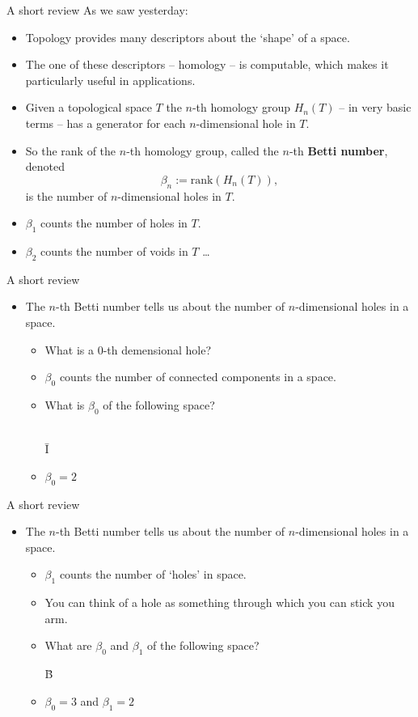 \begin{frame}{A short review}
As we saw yesterday:
\begin{itemize}
\item<2-> Topology provides many descriptors about the `shape' of a space.
\item<3-> The one of these descriptors -- homology -- is computable, which makes it particularly useful in applications.
\item<4-> Given a topological space $T$ the $n$-th homology group $H_n(T)$ -- in very basic terms -- has a generator for each $n$-dimensional hole in $T$. 
\item<5-> So the rank of the $n$-th homology group, called the $n$-th \textbf{Betti number}, denoted
	\[
	\beta_n := \textrm{rank}(H_n(T)),
	\]
is the number of $n$-dimensional holes in $T$.
\item<6-> $\beta_1$ counts the number of holes in $T$.
\item<7-> $\beta_2$ counts the number of voids in $T$ \ldots
\end{itemize}
\end{frame}
\begin{frame}{A short review}
\begin{itemize}
\item The $n$-th Betti number tells us about the number of $n$-dimensional holes in a space.
	\begin{itemize}
	\item<1-> What is a $0$-th demensional hole?
	\item<2-> $\beta_0$ counts the number of connected components in a space.
	\item<3-> What is $\beta_0$ of the following space?\\
	\
	\begin{center}
	{\fontsize{50pt}{1pt}\selectfont \={I}}
	\end{center}
	\item<4-> $\beta_0 = 2$
	\end{itemize}
\end{itemize}
\end{frame}
\begin{frame}{A short review}
\begin{itemize}
\item The $n$-th Betti number tells us about the number of $n$-dimensional holes in a space.
	\begin{itemize}
	\item<1-> $\beta_1$ counts the number of `holes' in space.
	\item<2-> You can think of a hole as something through which you can stick you arm.
	\item<3-> What are $\beta_0$ and $\beta_1$ of the following space?
	\begin{center}
	{\fontsize{50pt}{12pt}\selectfont \"{B}}
	\end{center}	
	\item<4-> $\beta_0 = 3$ and $\beta_1 = 2$
	\end{itemize}
\end{itemize}
\end{frame}
